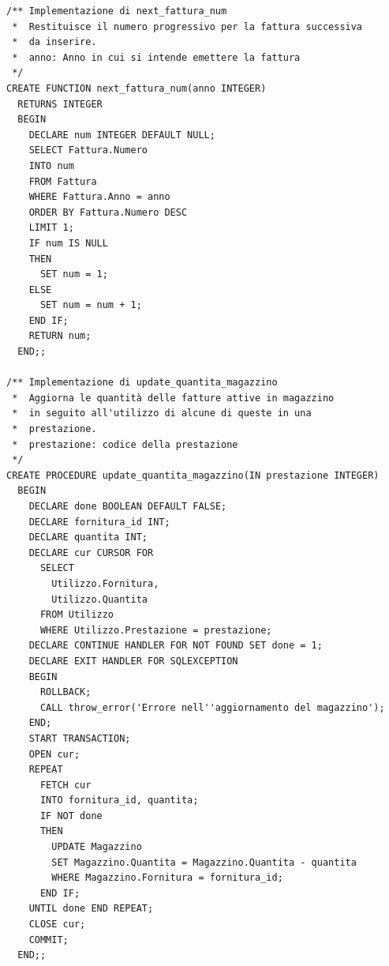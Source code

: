         \begin{lstlisting}
/** Implementazione di next_fattura_num
 *  Restituisce il numero progressivo per la fattura successiva
 *  da inserire.
 *  anno: Anno in cui si intende emettere la fattura
 */
CREATE FUNCTION next_fattura_num(anno INTEGER)
  RETURNS INTEGER
  BEGIN
    DECLARE num INTEGER DEFAULT NULL;
    SELECT Fattura.Numero
    INTO num
    FROM Fattura
    WHERE Fattura.Anno = anno
    ORDER BY Fattura.Numero DESC
    LIMIT 1;
    IF num IS NULL
    THEN
      SET num = 1;
    ELSE
      SET num = num + 1;
    END IF;
    RETURN num;
  END;;

/** Implementazione di update_quantita_magazzino
 *  Aggiorna le quantità delle fatture attive in magazzino
 *  in seguito all'utilizzo di alcune di queste in una 
 *  prestazione.
 *  prestazione: codice della prestazione
 */
CREATE PROCEDURE update_quantita_magazzino(IN prestazione INTEGER)
  BEGIN
    DECLARE done BOOLEAN DEFAULT FALSE;
    DECLARE fornitura_id INT;
    DECLARE quantita INT;
    DECLARE cur CURSOR FOR
      SELECT
        Utilizzo.Fornitura,
        Utilizzo.Quantita
      FROM Utilizzo
      WHERE Utilizzo.Prestazione = prestazione;
    DECLARE CONTINUE HANDLER FOR NOT FOUND SET done = 1;
    DECLARE EXIT HANDLER FOR SQLEXCEPTION
    BEGIN
      ROLLBACK;
      CALL throw_error('Errore nell''aggiornamento del magazzino');
    END;
    START TRANSACTION;
    OPEN cur;
    REPEAT
      FETCH cur
      INTO fornitura_id, quantita;
      IF NOT done
      THEN
        UPDATE Magazzino
        SET Magazzino.Quantita = Magazzino.Quantita - quantita
        WHERE Magazzino.Fornitura = fornitura_id;
      END IF;
    UNTIL done END REPEAT;
    CLOSE cur;
    COMMIT;
  END;;
        \end{lstlisting}
